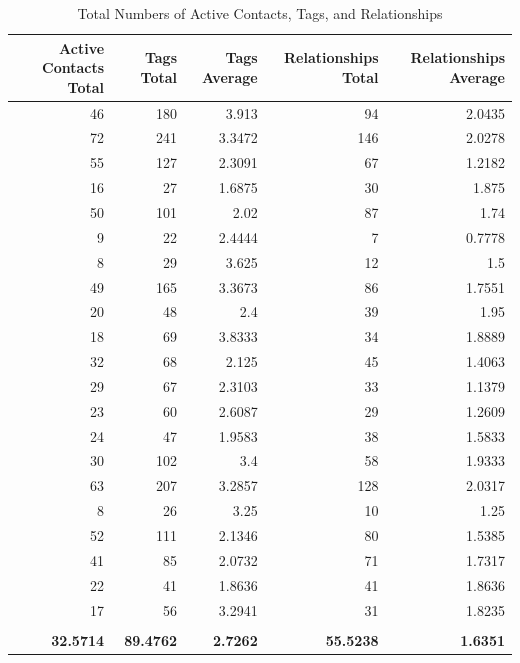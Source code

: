 \begin{table}[htbp]
  \centering
  \caption{Total Numbers of Active Contacts, Tags, and Relationships}\label{table:active_contacts} 
    \begin{tabular}{rrrrr}
    \toprule
    Active Contacts Total & Tags Total & Tags Average & Relationships Total & Relationships Average \\
    \midrule
    46    & 180   & 3.913 & 94    & 2.0435 \\
    72    & 241   & 3.3472 & 146   & 2.0278 \\
    55    & 127   & 2.3091 & 67    & 1.2182 \\
    16    & 27    & 1.6875 & 30    & 1.875 \\
    50    & 101   & 2.02  & 87    & 1.74 \\
    9     & 22    & 2.4444 & 7     & 0.7778 \\
    8     & 29    & 3.625 & 12    & 1.5 \\
    49    & 165   & 3.3673 & 86    & 1.7551 \\
    20    & 48    & 2.4   & 39    & 1.95 \\
    18    & 69    & 3.8333 & 34    & 1.8889 \\
    32    & 68    & 2.125 & 45    & 1.4063 \\
    29    & 67    & 2.3103 & 33    & 1.1379 \\
    23    & 60    & 2.6087 & 29    & 1.2609 \\
    24    & 47    & 1.9583 & 38    & 1.5833 \\
    30    & 102   & 3.4   & 58    & 1.9333 \\
    63    & 207   & 3.2857 & 128   & 2.0317 \\
    8     & 26    & 3.25  & 10    & 1.25 \\
    52    & 111   & 2.1346 & 80    & 1.5385 \\
    41    & 85    & 2.0732 & 71    & 1.7317 \\
    22    & 41    & 1.8636 & 41    & 1.8636 \\
    17    & 56    & 3.2941 & 31    & 1.8235 \\
          &       &       &       &  \\
    \textbf{32.5714} &  \textbf{89.4762} &  \textbf{2.7262} &  \textbf{55.5238} &  \textbf{1.6351} \\
    \bottomrule
    \end{tabular}%
  \label{tab:addlabel}%
\end{table}%

